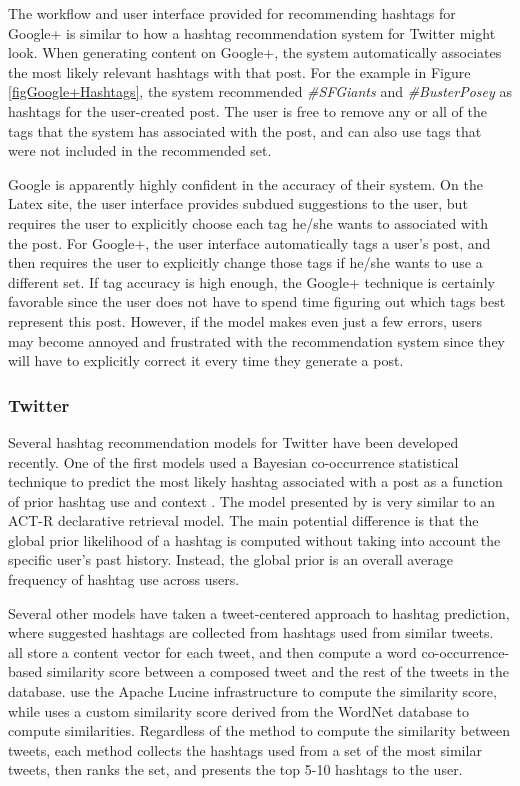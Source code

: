 \documentclass[man,floatsintext,donotrepeattitle]{apa6}
\begin{document}
The workflow and user interface provided for recommending hashtags for Google+ is similar to how a hashtag recommendation system for Twitter might look.
When generating content on Google+, the system automatically associates the most likely relevant hashtags with that post.
For the example in Figure \ref{figGoogle+Hashtags}, the system recommended \emph{\#SFGiants} and \emph{\#BusterPosey} as hashtags for the user-created post.
The user is free to remove any or all of the tags that the system has associated with the post, and can also use tags that were not included in the recommended set.

Google is apparently highly confident in the accuracy of their system.
On the Latex site, the user interface provides subdued suggestions to the user, but requires the user to explicitly choose each tag he/she wants to associated with the post.
For Google+, the user interface automatically tags a user's post, and then requires the user to explicitly change those tags if he/she wants to use a different set.
If tag accuracy is high enough, the Google+ technique is certainly favorable since the user does not have to spend time figuring out which tags best represent this post.
However, if the model makes even just a few errors, users may become annoyed and frustrated with the recommendation system since they will have to explicitly correct it every time they generate a post.

\subsubsection{Twitter}

Several hashtag recommendation models for Twitter have been developed recently.
One of the first models used a Bayesian co-occurrence statistical technique to predict the most likely hashtag associated with a post as a function of prior hashtag use and context \parencite{Mazzia2009}.
The model presented by \textcite{Mazzia2009} is very similar to an ACT-R declarative retrieval model.
The main potential difference is that the global prior likelihood of a hashtag is computed without taking into account the specific user's past history.
Instead, the global prior is an overall average frequency of hashtag use across users.

Several other models have taken a tweet-centered approach to hashtag prediction, where suggested hashtags are collected from hashtags used from similar tweets.
\textcites{Li2011, Zangerle2011, Kywe2012} all store a content vector for each tweet, and then compute a word co-occurrence-based similarity score between a composed tweet and the rest of the tweets in the database.
\textcites{Zangerle2011, Kywe2012} use the Apache Lucine infrastructure to compute the similarity score, while \textcite{Li2011} uses a custom similarity score derived from the WordNet database to compute similarities.
Regardless of the method to compute the similarity between tweets, each method collects the hashtags used from a set of the most similar tweets, then ranks the set, and presents the top 5-10 hashtags to the user.
\end{document}
